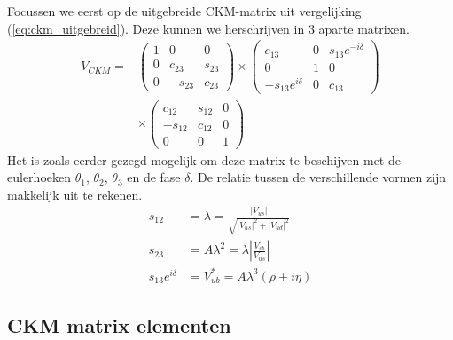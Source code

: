 \documentclass[../main.tex]{subfiles}
\begin{document}
Focussen we eerst op de uitgebreide CKM-matrix uit vergelijking (\ref{eq:ckm_uitgebreid}). Deze kunnen we herschrijven in 3 aparte matrixen.
\begin{equation}
    \begin{aligned}
        \label{eq:ckm_uitgebreid_split}
        V_{C K M}=&\left(\begin{array}{ccc}
                1 & 0 & 0 \\
                0 & c_{23} & s_{23} \\
                0 & -s_{23} & c_{23}
            \end{array}\right) \times\left(\begin{array}{ccc}
                c_{13} & 0 & s_{13} e^{-i \delta} \\
                0 & 1 & 0 \\
                -s_{13} e^{i \delta} & 0 & c_{13}
            \end{array}\right) \\
            & \times\left(\begin{array}{ccc}
                c_{12} & s_{12} & 0 \\
                -s_{12} & c_{12} & 0 \\
                0 & 0 & 1
        \end{array}\right)
    \end{aligned}
\end{equation}
Het is zoals eerder gezegd mogelijk om deze matrix te beschijven met de eulerhoeken $\theta_1$, $\theta_2$, $\theta_3$ en de fase $\delta$. De relatie tussen de verschillende vormen zijn makkelijk uit te rekenen.
\begin{equation}
    \begin{aligned}
        \label{eq:ckm_relaties}
        s_{12} &=\lambda=\frac{\left|V_{u s}\right|}{\sqrt{\left|V_{u s}\right|^{2}+\left|V_{u d}\right|^{2}}} \\
        s_{23} &=A \lambda^{2}=\lambda\left|\frac{V_{c b}}{V_{u s}}\right| \\
        s_{13} e^{i \delta} &=V_{u b}^{*}=A \lambda^{3}(\rho+i \eta)
    \end{aligned}
\end{equation}

\subsection{CKM matrix elementen}%
\label{sub:ckm_matrix_elementen}
\end{document}
